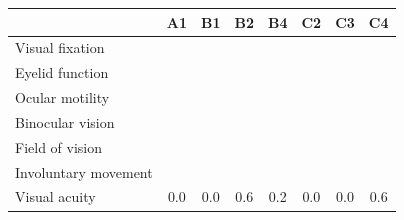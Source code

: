 \begin{tabular}{@{}lccccccc@{}}
	\toprule
	                     & A1       & B1        & B2        & B4       & C2        & C3        & C4        \\
	\midrule
	Visual fixation      & \noskill & \noskill  & \noskill  & \noskill & \noskill  & \noskill  & \noskill  \\
	Eyelid function      & \skill   & \skill    & \skill    & \skill   & \skill    & \noskill  & \noskill  \\
	Ocular motility      & \skill   & \noskill  & \skill    & \noskill & \snoskill & \snoskill & \noskill  \\
	Binocular vision     & \skill   & \skill    & \skill    & \skill   & \noskill  & \snoskill & \snoskill \\
	Field of vision      & \skill   & \skill    & \skill    & \skill   & \skill    & \snoskill & \noskill  \\
	Involuntary movement & \skill   & \snoskill & \snoskill & \noskill & \noskill  & \snoskill & \skill    \\
	\midrule
	Visual acuity        & 0.0      & 0.0       & 0.6       & 0.2      & 0.0       & 0.0       & 0.6       \\
	\bottomrule
\end{tabular}
